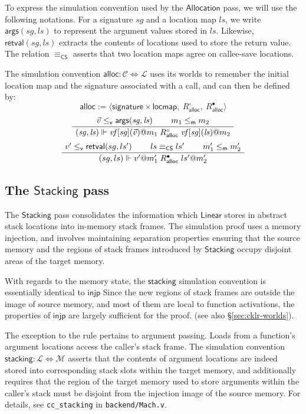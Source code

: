 \documentclass[acmsmall,screen,review,anonymous]{acmart}
\newcommand{\kw}[1]{\ensuremath{ \mathsf{#1} }}
\newcommand{\que}{\circ}
\newcommand{\ans}{\bullet}
\newcommand{\vref}{\le_\kw{v}}
\newcommand{\mext}{\le_\kw{m}}
\begin{document}
To express the simulation convention used by the \kw{Allocation} pass,
we will use the following notations.
For a signature $\mathit{sg}$ and a location map $\mathit{ls}$,
we write $\kw{args}(\mathit{sg}, \mathit{ls})$
to represent the argument values stored in $\mathit{ls}$.
Likewise,
$\kw{retval}(\mathit{sg}, \mathit{ls})$ extracts
the contents of locations used to store the return value.
The relation $\equiv_\kw{CS}$ asserts that
two location maps agree on callee-save locations.

The simulation convention
$\kw{alloc} : \mathcal{C} \Leftrightarrow \mathcal{L}$
uses its worlds to remember the initial location map
and the signature associated with a call,
and can then be defined by:
\[
  \kw{alloc} := \langle
      \kw{signature} \times \kw{locmap}, \:
      R_\kw{alloc}^\que, \:
      R_\kw{alloc}^\ans \rangle
\]
\[
  \AxiomC{$\vec{v} \vref \kw{args}(\mathit{sg}, \mathit{ls})$}
  \AxiomC{$m_1 \mext m_2$}
  \BinaryInfC{$
      (\mathit{sg}, \mathit{ls}) \Vdash
      \mathit{vf}[\mathit{sg}](\vec{v})@m_1
      \mathrel{R_\kw{alloc}^\que}
      \mathit{vf}[\mathit{sg}](\mathit{ls})@m_2$}
  \DisplayProof
\]
\[
  \AxiomC{$v' \vref \kw{retval}(sg, ls')$}
  \AxiomC{$ls \equiv_\kw{CS} ls'$}
  \AxiomC{$m_1' \mext m_2'$}
  \TrinaryInfC{$
      (sg, ls) \Vdash
      v'@m_1'
      \mathrel{R_\kw{alloc}^\ans}
      ls'@m_2'$}
  \DisplayProof
\]


\subsection{The \kw{Stacking} pass} \label{sec:stacking} %

The \kw{Stacking} pass
consolidates the information which
\kw{Linear} stores in abstract stack locations
into in-memory stack frames.
The simulation proof uses a memory injection,
and involves maintaining separation properties
ensuring that the source memory and
the regions of stack frames
introduced by \kw{Stacking}
occupy disjoint areas of the target memory.

With regards to the memory state,
the \kw{stacking} simulation convention
is essentially identical to \kw{injp}
Since the new regions of stack frames
are outside the image of source memory,
and most of them are local to
function activations,
the properties of \kw{injp}
are largely sufficient for the proof.
(see also \S\ref{sec:cklr-worlds}).

The exception to the rule pertains to argument passing.
Loads from a function's argument locations
access the caller's stack frame.
The simulation convention
$\kw{stacking} : \mathcal{L} \Leftrightarrow \mathcal{M}$
asserts that the contents of argument locations
are indeed stored into corresponding stack slots
within the target memory,
and additionally
requires that the region of the target memory
used to store arguments within the caller's stack
must be disjoint from the injection image of the source memory.
For details,
see \texttt{cc\_stacking} in \texttt{backend/Mach.v}.
\end{document}
